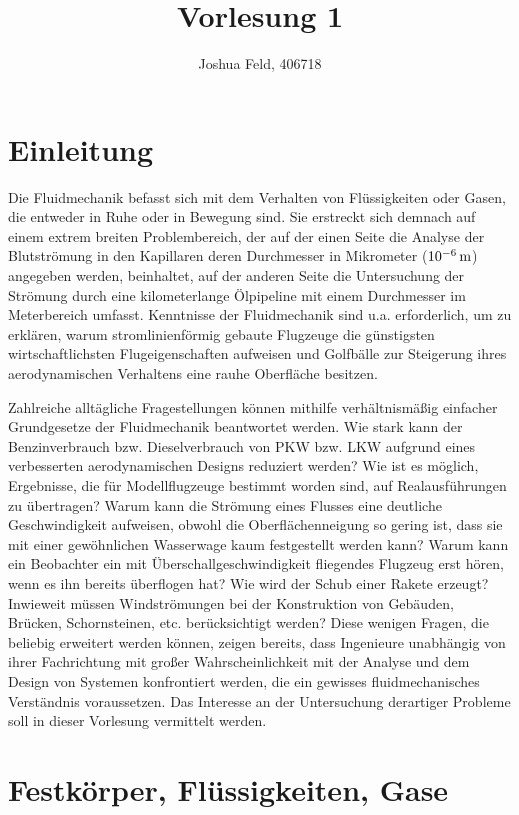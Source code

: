 \documentclass{lecture}
\institute{Lehrstuhl für Strömungslehre und Aerodynamisches Institut}
\title{Vorlesung 1}
\author{Joshua Feld, 406718}
\begin{document}
    \maketitle


    \section*{Einleitung}

    Die Fluidmechanik befasst sich mit dem Verhalten von Flüssigkeiten oder Gasen, die entweder in Ruhe oder in Bewegung sind.
    Sie erstreckt sich demnach auf einem extrem breiten Problembereich, der auf der einen Seite die Analyse der Blutströmung in den Kapillaren deren Durchmesser in Mikrometer (\(10^{-6}\,\si{\meter}\)) angegeben werden, beinhaltet, auf der anderen Seite die Untersuchung der Strömung durch eine kilometerlange Ölpipeline mit einem Durchmesser im Meterbereich umfasst.
    Kenntnisse der Fluidmechanik sind u.a. erforderlich, um zu erklären, warum stromlinienförmig gebaute Flugzeuge die günstigsten wirtschaftlichsten Flugeigenschaften aufweisen und Golfbälle zur Steigerung ihres aerodynamischen Verhaltens eine rauhe Oberfläche besitzen.

    Zahlreiche alltägliche Fragestellungen können mithilfe verhältnismäßig einfacher Grundgesetze der Fluidmechanik beantwortet werden.
    Wie stark kann der Benzinverbrauch bzw. Dieselverbrauch von PKW bzw. LKW aufgrund eines verbesserten aerodynamischen Designs reduziert werden?
    Wie ist es möglich, Ergebnisse, die für Modellflugzeuge bestimmt worden sind, auf Realausführungen zu übertragen?
    Warum kann die Strömung eines Flusses eine deutliche Geschwindigkeit aufweisen, obwohl die Oberflächenneigung so gering ist, dass sie mit einer gewöhnlichen Wasserwage kaum festgestellt werden kann?
    Warum kann ein Beobachter ein mit Überschallgeschwindigkeit fliegendes Flugzeug erst hören, wenn es ihn bereits überflogen hat?
    Wie wird der Schub einer Rakete erzeugt?
    Inwieweit müssen Windströmungen bei der Konstruktion von Gebäuden, Brücken, Schornsteinen, etc. berücksichtigt werden?
    Diese wenigen Fragen, die beliebig erweitert werden können, zeigen bereits, dass Ingenieure unabhängig von ihrer Fachrichtung mit großer Wahrscheinlichkeit mit der Analyse und dem Design von Systemen konfrontiert werden, die ein gewisses fluidmechanisches Verständnis voraussetzen.
    Das Interesse an der Untersuchung derartiger Probleme soll in dieser Vorlesung vermittelt werden.


    \section*{Festkörper, Flüssigkeiten, Gase}
\end{document}
